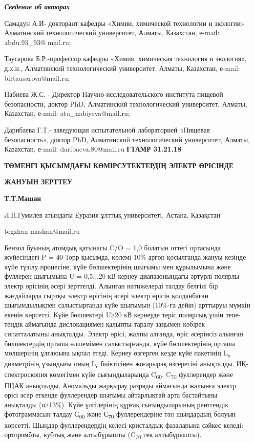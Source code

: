 \emph{{\bfseries Сведение об авторах}}

Самадун А.И- докторант кафедры «Химии, химической технологии и экологии»
Алматинский технологический университет, Алматы, Казахстан, е-mail:
abdu.93\_93@ mail.ru;

Таусарова Б.Р.-профессор кафедры «Химия, химическая технология и
экология», д.х.н., Алматинский технологический университет, Алматы,
Казахстан, е-mail: birtausarova@mail.ru;

Набиева Ж.С. - Директор Научно-исследовательского института пищевой
безопасности, доктор PhD, Алматинский технологический университет,
Алматы, Казахстан, е-mail: atu\_nabiyeva@mail.ru;

Дарибаева Г.Т.- заведующая испытательной лабораторией «Пищевая
безопасность», доктор PhD, Алматинский технологический университет,
Алматы, Казахстан, е-mail: daribaeva.80@mail.ru\newpage
{\bfseries ҒТАМР 31.21.18}

{\bfseries ТӨМЕНГІ ҚЫСЫМДАҒЫ КӨМІРСУТЕКТЕРДІҢ ЭЛЕКТР ӨРІСІНДЕ}

{\bfseries ЖАНУЫН ЗЕРТТЕУ}

{\bfseries Т.Т.Машан}

Л.Н.Гумилев атындағы Еуразия ұлттық университеті, Астана, Қазақстан

togzhan-mashan@mail.ru

Бензол буының атомдық қатынасы C/O = 1,0 болатын оттегі ортасында
жүйесіндегі P = 40 Торр қысымда, көлемі 10\% аргон қосылғанда жануы
кезінде күйе түзілу процесіне, күйе бөлшектерінің шығымы мен құрылымына
және фуллерен шығымына U = 0,5...20 кВ кернеу диапазонындағы әртүрлі
полярлы электр өрісінің әсері зерттелді. Алынған нәтижелерді талдау
белгілі бір жағдайларда сыртқы электр өрісінің әсері электр өрісін
қолданбаған шығымдылықпен салыстырғанда күйе шығымын (10\%-ға дейін)
арттыруы мүмкін екенін көрсетті. Күйе бөлшектері U≥20 кВ кернеуде теріс
полярлық үшін тепе-теңдік аймағында дислокациямен қалыпты таралу заңымен
көбірек сипатталатыны анықталды. Электр өрісі, жалпы алғанда, өріс
әсерінсіз алынған бөлшектердің орташа өлшемімен салыстырғанда, күйе
бөлшектерінің орташа мөлшерінің ұлғаюына ықпал етеді. Кернеу өзгерген
кезде күйе пакетінің L\textsubscript{a} диаметрінің ұзындығы оның
L\textsubscript{c} биіктігінен жоғарырақ өзгеретіні анықталды.
ИҚ-спектроскопия көмегімен күйе сығындыларында C\textsubscript{60},
C\textsubscript{70} фуллерендер және ПЦАК анықталды. Аномальды жарқырау
разряды аймағында жалынға электр өрісі әсер еткенде фуллерендер шығымы
айтарлықтай арта бастайтыны анықталды (α≥13\%). Күйе үлгілерінің құрғақ
сығындыларының рентгендік фотограммасын талдау С\textsubscript{60} және
С\textsubscript{70} фуллерендеріне тән шыңдардың болуын көрсетті. Шыңдар
фуллерендердің келесі кристалдық фазаларына сәйкес келеді: орторомбты,
кубтық және алтыбұрышты (C\textsubscript{70} тек алтыбұрышты).

